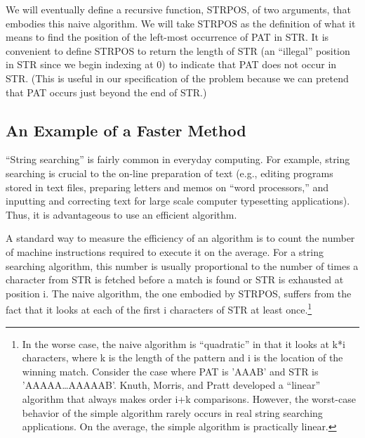 \documentclass[11pt]{book}
\newcommand{\pubdefaulttextsize}{\large}
\begin{document}
We will eventually define a recursive function, STRPOS, of two arguments,
that embodies this naive algorithm.  We will take STRPOS as the
definition of what it means to find the position of the left-most
occurrence of PAT in STR.  It is convenient to
define STRPOS to return the length of STR (an ``illegal'' position in
STR since we begin indexing at 0) to indicate that PAT does not
occur in STR.  (This is useful in our specification of the problem
because we can pretend that PAT occurs just beyond the end of STR.)
\subsection{An Example of a Faster Method}
\pubdefaulttextsize
``String searching''  is fairly common in everyday computing.
For example, string searching is crucial to the on-line preparation
of text (e.g., editing programs stored in text files, preparing
letters and memos on ``word processors,'' and  inputting and correcting
text for large scale computer typesetting applications).
Thus, it is advantageous to use an efficient algorithm.

A standard way to measure the efficiency of an algorithm is to
count the number of machine instructions required to execute it
on the average.  For a string searching algorithm, this number is
usually proportional to the number of times a character from STR is
fetched before a match is found or STR is exhausted at position i.  The naive
algorithm, the one embodied by STRPOS, suffers from the fact that 
it looks at each of the first i characters of STR at least once.\footnote{In the worse case, the naive algorithm is ``quadratic'' in that it looks at k*i characters, where k is the length of the pattern and i is the location of the winning match.  Consider the case where PAT is 'AAAB' and STR is 'AAAAA\ldots{}AAAAAB'.  Knuth, Morris, and Pratt \cite{KMP} developed a ``linear'' algorithm that always makes order i+k comparisons.  However, the worst-case behavior of the simple algorithm rarely occurs in real string searching applications.  On the average, the simple algorithm is practically linear.}
\end{document}
